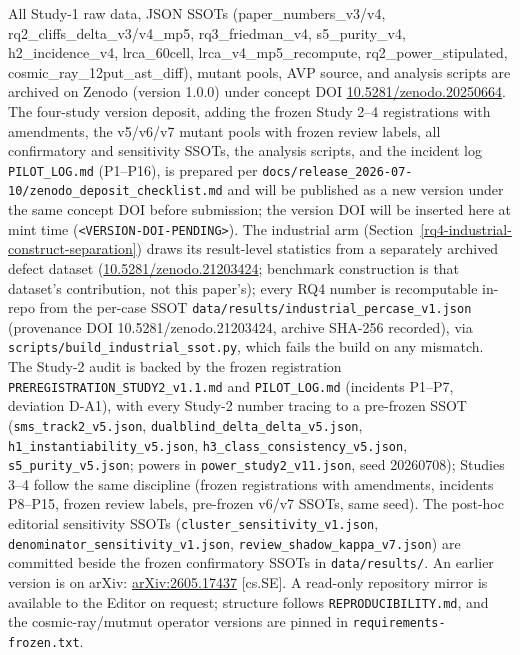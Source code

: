 \documentclass[manuscript,screen,review]{acmart}
\begin{document}
All Study-1 raw data, JSON SSOTs (paper\_numbers\_v3/v4,
rq2\_cliffs\_delta\_v3/v4\_mp5, rq3\_friedman\_v4, s5\_purity\_v4,
h2\_incidence\_v4, lrca\_60cell, lrca\_v4\_mp5\_recompute,
rq2\_power\_stipulated, cosmic\_ray\_12put\_ast\_diff), mutant pools, AVP source,
and analysis scripts are archived on Zenodo (version 1.0.0) under concept DOI
\href{https://doi.org/10.5281/zenodo.20250664}{10.5281/zenodo.20250664}. The
four-study version deposit, adding the frozen Study 2--4 registrations with
amendments, the v5/v6/v7 mutant pools with frozen review labels, all
confirmatory and sensitivity SSOTs, the analysis scripts, and the incident log
\texttt{PILOT\_LOG.md} (P1--P16), is prepared per
\texttt{docs/release\_2026-07-10/zenodo\_deposit\_checklist.md} and will be
published as a new version under the same concept DOI before submission; the
version DOI will be inserted here at mint time
(\texttt{<VERSION-DOI-PENDING>}). The
industrial arm (Section~\ref{rq4-industrial-construct-separation}) draws its
result-level statistics from a separately archived defect dataset
\citep{defect4mr2026}
(\href{https://doi.org/10.5281/zenodo.21203424}{10.5281/zenodo.21203424};
benchmark construction is that dataset's contribution, not this paper's); every
RQ4 number is recomputable in-repo from the per-case SSOT
\texttt{data/results/industrial\_percase\_v1.json} (provenance DOI
10.5281/zenodo.21203424, archive SHA-256 recorded), via
\texttt{scripts/build\_industrial\_ssot.py}, which fails the build on any
mismatch. The Study-2 audit is backed by the frozen registration
\texttt{PREREGISTRATION\_STUDY2\_v1.1.md} and \texttt{PILOT\_LOG.md} (incidents
P1--P7, deviation D-A1), with every Study-2 number tracing to a pre-frozen SSOT
(\texttt{sms\_track2\_v5.json}, \texttt{dualblind\_delta\_delta\_v5.json},
\texttt{h1\_instantiability\_v5.json}, \texttt{h3\_class\_consistency\_v5.json},
\texttt{s5\_purity\_v5.json}; powers in \texttt{power\_study2\_v11.json}, seed
20260708); Studies 3--4 follow the same discipline (frozen registrations
with amendments, incidents P8--P15, frozen review labels, pre-frozen v6/v7
SSOTs, same seed). The post-hoc editorial sensitivity SSOTs
(\texttt{cluster\_sensitivity\_v1.json},
\texttt{denominator\_sensitivity\_v1.json},
\texttt{review\_shadow\_kappa\_v7.json}) are committed beside the frozen
confirmatory SSOTs in \texttt{data/results/}. An earlier version is on arXiv:
\href{https://arxiv.org/abs/2605.17437}{arXiv:2605.17437} [cs.SE]. A read-only
repository mirror is available to the Editor on request; structure follows
\texttt{REPRODUCIBILITY.md}, and the cosmic-ray/mutmut operator versions are
pinned in \texttt{requirements-frozen.txt}.
\end{document}
